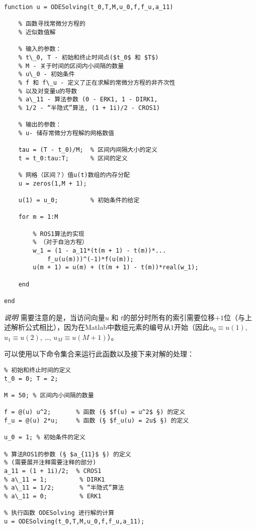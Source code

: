 \documentclass[twoside]{book}
\begin{document}
\begin{CJK*}{GBK}{song}
\begin{lstlisting}
function u = ODESolving(t_0,T,M,u_0,f,f_u,a_11)

    % 函数寻找常微分方程的
    % 近似数值解

    % 输入的参数：
    % t\_0, T - 初始和终止时间点($t_0$ 和 $T$)
    % M - 关于时间的区间内小间隔的数量
    % u\_0 - 初始条件
    % f 和 f\_u - 定义了正在求解的常微分方程的非齐次性
    % 以及对变量u的导数
    % a\_11 - 算法参数 (0 - ERK1, 1 - DIRK1,
    % 1/2 - “半隐式”算法, (1 + 1i)/2 - CROS1)

    % 输出的参数：
    % u- 储存常微分方程解的网格数值

    tau = (T - t_0)/M;  % 区间内间隔大小的定义
    t = t_0:tau:T;      % 区间的定义

    % 网格（区间？）值u(t)数组的内存分配
    u = zeros(1,M + 1);

    u(1) = u_0;         % 初始条件的给定

    for m = 1:M

        % ROS1算法的实现
        % （对于自治方程）
        w_1 = (1 - a_11*(t(m + 1) - t(m))*...
            f_u(u(m)))^(-1)*f(u(m));
        u(m + 1) = u(m) + (t(m + 1) - t(m))*real(w_1);

    end

end
\end{lstlisting}


\emph{说明 } 需要注意的是，当访问向量$u$ 和 $t$的部分时所有的索引需要位移$+1$位（与上述解析公式相比），因为在Matlab中数组元素的编号从$1$开始（因此$u_0 \equiv u(1)$, $u_1 \equiv u(2)$, \ldots, $u_M \equiv u(M + 1)$）。


可以使用以下命令集合来运行此函数以及接下来对解的处理：
%
\begin{framed}
\begin{lstlisting}
% 初始和终止时间的定义
t_0 = 0; T = 2;

M = 50; % 区间内小间隔的数量

f = @(u) u^2;       % 函数 (§ $f(u) = u^2$ §) 的定义
f_u = @(u) 2*u;     % 函数 (§ $f_u(u) = 2u$ §) 的定义

u_0 = 1; % 初始条件的定义

% 算法ROS1的参数 (§ $a_{11}$ §) 的定义
% (需要展开注释需要注释的部分)
a_11 = (1 + 1i)/2;  % CROS1
% a\_11 = 1;         % DIRK1
% a\_11 = 1/2;       % “半隐式”算法
% a\_11 = 0;         % ERK1

% 执行函数 ODESolving 进行解的计算
u = ODESolving(t_0,T,M,u_0,f,f_u,a_11);


\end{lstlisting}
\end{framed}
\end{CJK*}
\end{document}
